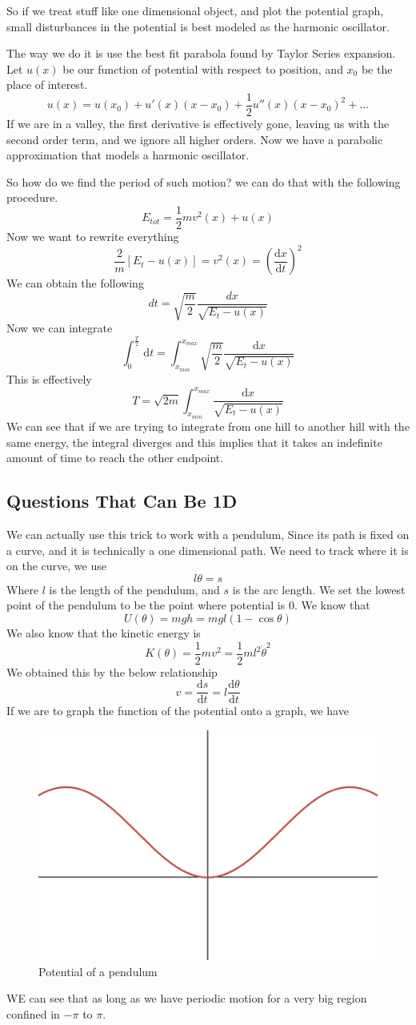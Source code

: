 \documentclass[12pt]{article}
\newcommand{\dydx}[2]{\frac{\text{d} #1}{\text{d} #2}}
\newcommand{\sqbkt}[1]{\left[ #1 \right]}
\newcommand{\paren}[1]{\left( #1 \right)}
\begin{document}
So if we treat stuff like one dimensional object, and plot the potential graph, small disturbances in the potential is best modeled as the harmonic oscillator. 

The way we do it is use the best fit parabola found by Taylor Series expansion. Let $u(x)$ be our function of potential with respect to position, and $x_0$ be the place of interest.
\[
u(x) = u(x_0) + u'(x)(x-x_0) + \frac{1}{2}u''(x)(x-x_0)^2 + \ldots
\]
If we are in a valley, the first derivative is effectively gone, leaving us with the second order term, and we ignore all higher orders. Now we have a parabolic approximation that models a harmonic oscillator.

So how do we find the period of such motion? we can do that with the following procedure.
\[
E_{tot} = \frac{1}{2}mv^2(x) + u(x)
\]
Now we want to rewrite everything
\[
\frac{2}{m}\sqbkt{E_t - u(x)} = v^2(x) = \paren{\dydx{x}{t}}^2
\]
We can obtain the following
\[
dt = \sqrt{\frac{m}{2}}\frac{dx}{\sqrt{E_t - u(x)}}
\]
Now we can integrate
\[
\int_0^{\frac{T}{2}} \,\text{d}t = \int_{x_{min}}^{x_{max}}  \sqrt{\frac{m}{2}}\frac{\text{d}x}{\sqrt{E_t - u(x)}}
\]
This is effectively
\[
T = \sqrt{2m}\int_{x_{min}}^{x_{max}} \frac{\text{d}x}{\sqrt{E_t - u(x)}}
\]
We can see that if we are trying to integrate from one hill to another hill with the same energy, the integral diverges and this implies that it takes an indefinite amount of time to reach the other endpoint. 

\subsection{Questions That Can Be 1D}
We can actually use this trick to work with a pendulum, Since its path is fixed on a curve, and it is technically a one dimensional path. We need to track where it is on the curve, we use
\[
l\theta = s
\]
Where $l$ is the length of the pendulum, and $s$ is the arc length. We set the lowest point of the pendulum to be the point where potential is $0$. We know that
\[
U(\theta) = mgh = mgl(1-\cos\theta)
\]
We also know that the kinetic energy is
\[
K(\theta) = \frac{1}{2}mv^2 = \frac{1}{2}ml^2\dot{\theta}^2
\]
We obtained this by the below relationship
\[
v = \dydx{s}{t} = l\dydx{\theta}{t}
\]
If we are to graph the function of the potential onto a graph, we have
\begin{figure}[!h]
    \centering
    \includegraphics[width=0.5\linewidth]{Pictures//NotesPic/pendulumPotential.png}
    \caption{Potential of a pendulum}
    \label{fig:pendulumpotential}
\end{figure}
WE can see that as long as we have periodic motion for a very big region confined in $-\pi$ to $\pi$.
\end{document}
